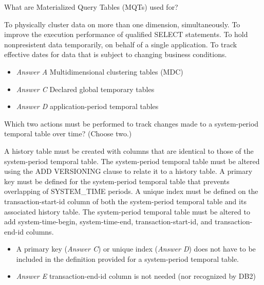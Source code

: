 \documentclass[answers, 11pt]{exam}
\begin{document}
\begin{questions}
\question[1]
What are Materialized Query Tables (MQTs) used for?
\begin{choices}
	\choice To physically cluster data on more than one dimension, simultaneously.
	\CorrectChoice To improve the execution performance of qualified SELECT statements.
	\choice To hold nonpresistent data temporarily, on behalf of a single application.
	\choice To track effective dates for data that is subject to changing business conditions.
\end{choices}

\begin{solution}
	\begin{itemize}
		\item \textit{Answer A} Multidimensional clustering tables (MDC)
		\item \textit{Answer C} Declared global temporary tables
		\item \textit{Answer D} application-period temporal tables
	\end{itemize}
\end{solution}


\question[1]
Which two actions must be performed to track changes made to a system-period temporal table over time?
(Choose two.)
\begin{choices}
	\CorrectChoice A history table must be created with columns that are identical to those of the system-period
	temporal table.
	\CorrectChoice The system-period temporal table must be altered using the ADD VERSIONING clause to relate it to
	a history table.
	\choice A primary key must be defined for the system-period temporal table that prevents overlapping
	of SYSTEM\_TIME periods.
	\choice A unique index must be defined on the transaction-start-id column of both the system-period 
	temporal table and its associated history table.
	\choice The system-period temporal table must be altered to add system-time-begin, system-time-end, 
	transaction-start-id, and transaction-end-id columns.
\end{choices}

\begin{solution}
	\begin{itemize}
		\item A primary key (\textit{Answer C}) or unique index (\textit{Answer D}) does not have to be included in the definition provided
		for a system-period temporal table.
		\item \textit{Answer E} transaction-end-id column is not needed (nor recognized by DB2)
	\end{itemize}
\end{solution}


\end{questions}
\end{document}
